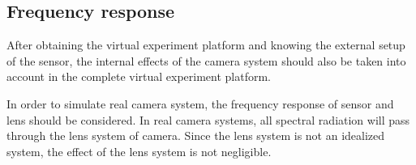 \subsection{Frequency response}
After obtaining the virtual experiment platform and knowing the external setup of the 
sensor, the internal effects of the camera system should also be taken into account 
in the complete virtual experiment platform.


In order to simulate real camera system, the frequency response of sensor and lens 
should be considered. In real camera systems, all spectral radiation will 
pass through the lens system of camera. Since the lens system is not an 
idealized system, the effect of the lens system is not negligible. 

